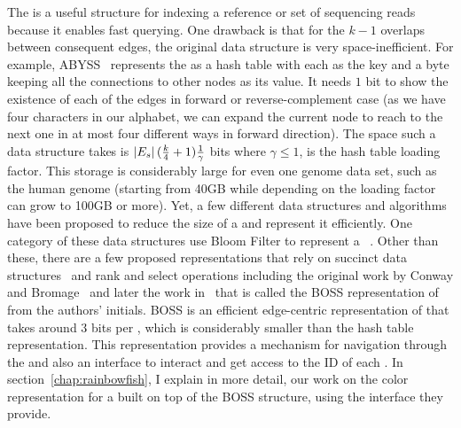 The \dbg is a useful structure for indexing a reference or set of sequencing reads
because it enables fast querying.
One drawback is that for the $k-1$ overlaps between consequent edges,
the original data structure is very space-inefficient. For example,
ABYSS~\cite{simpson2009abyss} represents the \dbg as a hash table with each \kmer
as the key and a byte keeping all the connections to other nodes as its value.
It needs $1$ bit to show the existence of each of the edges in forward or reverse-complement case
(as we have four characters in our alphabet, we can expand the current node
to reach to the next one in at most four different ways in forward direction).
The space such a data structure takes is $\left|E_s\right|(\frac{k}{4}+1)\frac{1}{\gamma}$ bits
where $\gamma \leq 1$, is the hash table loading factor.
This storage is considerably large for even one genome data set,
such as the human genome (starting from 40GB while depending on the loading factor can grow to 100GB or more).
Yet, a few different data structures and algorithms have been proposed to reduce the size of a \dbg
and represent it efficiently. One category of these data structures use Bloom Filter
to represent a \dbg~\cite{pell2012scaling,salikhov2013using,chikhi2012space,chikhi2013space,holley2016bloom}.
Other than these, there are a few proposed representations
that rely on succinct data structures~\cite{gbmp2014sea}
and rank and select operations including the original work by Conway and Bromage~\cite{conway2011succinct}
and later the work in~\cite{BoweOn12} that is called the BOSS representation of \dbg from the authors’ initials.
BOSS is an efficient edge-centric representation of \dbg that takes around 3 bits per \kmer,
which is considerably smaller than the hash table representation.
This representation provides a mechanism for navigation through the \dbg
and also an interface to interact and get access to the ID of each \kmer.
In section~\ref{chap:rainbowfish}, I explain in more detail, our work on the color representation
for a \dbg built on top of the BOSS structure, using the interface they provide.


